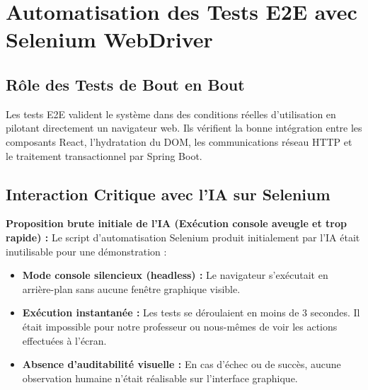 \documentclass[11pt, a4paper, openany]{report}
\begin{document}
\chapter{Automatisation des Tests E2E avec Selenium WebDriver}

\section{Rôle des Tests de Bout en Bout}
Les tests E2E valident le système dans des conditions réelles d'utilisation en pilotant directement un navigateur web. Ils vérifient la bonne intégration entre les composants React, l'hydratation du DOM, les communications réseau HTTP et le traitement transactionnel par Spring Boot.

\section{Interaction Critique avec l'IA sur Selenium}

\begin{aiCritiqueBox}
\textbf{Proposition brute initiale de l'IA (Exécution console aveugle et trop rapide) :}
Le script d'automatisation Selenium produit initialement par l'IA était inutilisable pour une démonstration :
\begin{itemize}[label=$\times$, itemsep=1pt]
    \item \textbf{Mode console silencieux (headless) :} Le navigateur s'exécutait en arrière-plan sans aucune fenêtre graphique visible.
    \item \textbf{Exécution instantanée :} Les tests se déroulaient en moins de 3 secondes. Il était impossible pour notre professeur ou nous-mêmes de voir les actions effectuées à l'écran.
    \item \textbf{Absence d'auditabilité visuelle :} En cas d'échec ou de succès, aucune observation humaine n'était réalisable sur l'interface graphique.
\end{itemize}
\end{aiCritiqueBox}
\end{document}
